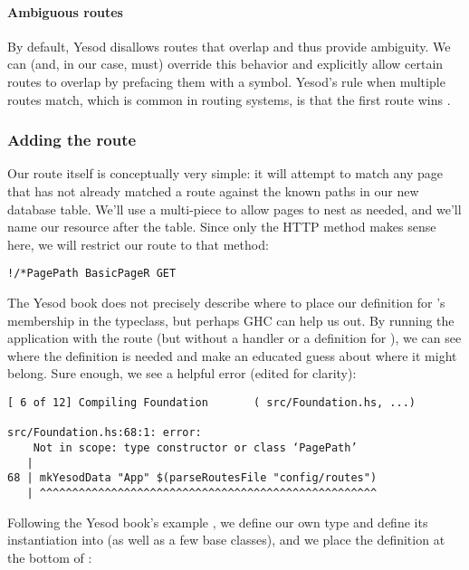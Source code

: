 \paragraph{Ambiguous routes} By default, Yesod disallows routes that overlap and thus provide ambiguity. We can (and, in our case, must) override this behavior and explicitly allow certain routes to overlap by prefacing them with a \code{!} symbol. Yesod's rule when multiple routes match, which is common in routing systems, is that the first route wins \cite{ybkRouting}.

\subsubsection{Adding the route}

Our route itself is conceptually very simple: it will attempt to match any page that has not already matched a route against the known paths in our new database table. We'll use a multi-piece to allow pages to nest as needed, and we'll name our resource after the  table. Since only the  HTTP method makes sense here, we will restrict our route to that method:

\begin{Verbatim}
!/*PagePath BasicPageR GET
\end{Verbatim}

The Yesod book does not precisely describe where to place our definition for 's membership in the  typeclass, but perhaps GHC can help us out. By running the application with the route (but without a handler or a definition for ), we can see where the definition is needed and make an educated guess about where it might belong. Sure enough, we see a helpful error (edited for clarity):

\begin{Verbatim}
[ 6 of 12] Compiling Foundation       ( src/Foundation.hs, ...)

src/Foundation.hs:68:1: error:
    Not in scope: type constructor or class ‘PagePath’
   |
68 | mkYesodData "App" $(parseRoutesFile "config/routes")
   | ^^^^^^^^^^^^^^^^^^^^^^^^^^^^^^^^^^^^^^^^^^^^^^^^^^^^

\end{Verbatim}

Following the Yesod book's example \cite{ybkRouting}, we define our own  type and define its instantiation into  (as well as a few base classes), and we place the definition at the bottom of :

